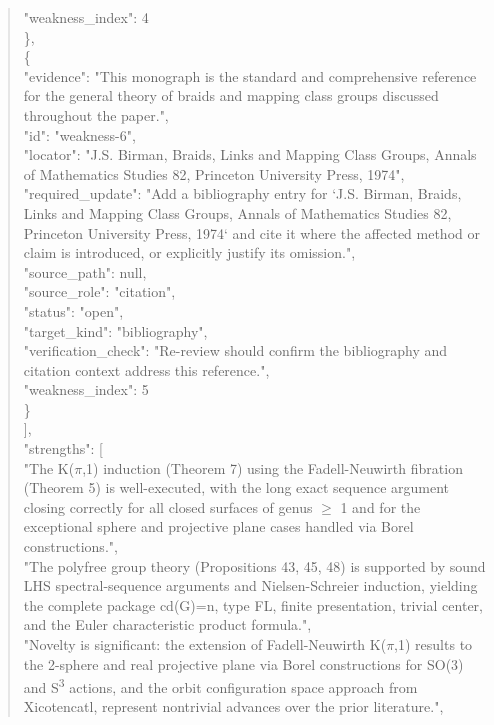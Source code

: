 \documentclass[11pt]{article}
\begin{document}
\begin{quote}
      "weakness\_index": 4\\
    \},\\
    \{\\
      "evidence": "This monograph is the standard and comprehensive reference for the general theory of braids and mapping class groups discussed throughout the paper.",\\
      "id": "weakness-6",\\
      "locator": "J.S. Birman, Braids, Links and Mapping Class Groups, Annals of Mathematics Studies 82, Princeton University Press, 1974",\\
      "required\_update": "Add a bibliography entry for `J.S. Birman, Braids, Links and Mapping Class Groups, Annals of Mathematics Studies 82, Princeton University Press, 1974` and cite it where the affected method or claim is introduced, or explicitly justify its omission.",\\
      "source\_path": null,\\
      "source\_role": "citation",\\
      "status": "open",\\
      "target\_kind": "bibliography",\\
      "verification\_check": "Re-review should confirm the bibliography and citation context address this reference.",\\
      "weakness\_index": 5\\
    \}\\
  ],\\
  "strengths": [\\
    "The K(\ensuremath{\pi},1) induction (Theorem 7) using the Fadell-Neuwirth fibration (Theorem 5) is well-executed, with the long exact sequence argument closing correctly for all closed surfaces of genus \ensuremath{\ge} 1 and for the exceptional sphere and projective plane cases handled via Borel constructions.",\\
    "The polyfree group theory (Propositions 43, 45, 48) is supported by sound LHS spectral-sequence arguments and Nielsen-Schreier induction, yielding the complete package cd(G)=n, type FL, finite presentation, trivial center, and the Euler characteristic product formula.",\\
    "Novelty is significant: the extension of Fadell-Neuwirth K(\ensuremath{\pi},1) results to the 2-sphere and real projective plane via Borel constructions for SO(3) and S\textsuperscript{3} actions, and the orbit configuration space approach from Xicotencatl, represent nontrivial advances over the prior literature.",\\

\end{quote}
\end{document}
